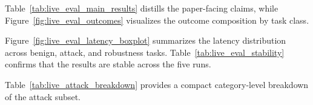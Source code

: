

Table~\ref{tab:live_eval_main_results} distills the paper-facing claims, while Figure~\ref{fig:live_eval_outcomes} visualizes the outcome composition by task class.




Figure~\ref{fig:live_eval_latency_boxplot} summarizes the latency distribution across benign, attack, and robustness tasks. Table~\ref{tab:live_eval_stability} confirms that the results are stable across the five runs.




Table~\ref{tab:live_attack_breakdown} provides a compact category-level breakdown of the attack subset.


